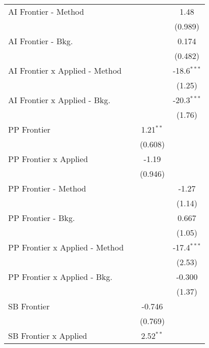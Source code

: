 \begin{tabular}{lccc}
   AI Frontier - Method           &           &               & 1.48\\   
                                  &           &               & (0.989)\\   
   AI Frontier - Bkg.             &           &               & 0.174\\   
                                  &           &               & (0.482)\\   
   AI Frontier x Applied - Method &           &               & -18.6$^{***}$\\   
                                  &           &               & (1.25)\\   
   AI Frontier x Applied - Bkg.   &           &               & -20.3$^{***}$\\   
                                  &           &               & (1.76)\\   
   PP Frontier                    &           & 1.21$^{**}$   &   \\   
                                  &           & (0.608)       &   \\   
   PP Frontier x Applied          &           & -1.19         &   \\   
                                  &           & (0.946)       &   \\   
   PP Frontier - Method           &           &               & -1.27\\   
                                  &           &               & (1.14)\\   
   PP Frontier - Bkg.             &           &               & 0.667\\   
                                  &           &               & (1.05)\\   
   PP Frontier x Applied - Method &           &               & -17.4$^{***}$\\   
                                  &           &               & (2.53)\\   
   PP Frontier x Applied - Bkg.   &           &               & -0.300\\   
                                  &           &               & (1.37)\\   
   SB Frontier                    &           & -0.746        &   \\   
                                  &           & (0.769)       &   \\   
   SB Frontier x Applied          &           & 2.52$^{**}$   &   \\   

\end{tabular}
